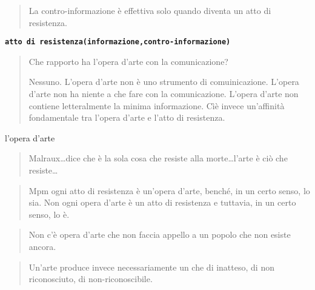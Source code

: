 \documentclass{../../lib/gs}
\newcommand{\apf}[3]{\textbf{\texttt{#1(#2,#3)}}}
\begin{document}
\begin{quote}
\begin{sf}
\small
  La contro-informazione è effettiva solo quando diventa un atto di resistenza.
  \cite{deleuze2009}
  \end{sf}
\end{quote}

\apf{atto di resistenza}{informazione}{contro-informazione}


\begin{quote}
\begin{sf}
\small
  Che rapporto ha l'opera d'arte con la comunicazione?

  Nessuno. L'opera d'arte non è uno strumento di comuinicazione. L'opera d'arte
  non ha niente a che fare con la comunicazione. L'opera d'arte non contiene
  letteralmente la minima informazione. Cìè invece un'affinità fondamentale tra
  l'opera d'arte e l'atto di resistenza.
  \cite{deleuze2009}
  \end{sf}
\end{quote}

l'opera d'arte

\begin{quote}
\begin{sf}
\small
  Malraux\ldots dice che è la sola cosa che resiste alla morte\ldots l'arte
  è ciò che resiste\ldots
  \cite{deleuze2009}
  \end{sf}
\end{quote}

\begin{quote}
\begin{sf}
\small
  Mpm ogni atto di resistenza è un'opera d'arte, benché, in un certo senso, lo
  sia. Non ogni opera d'arte è un atto di resistenza e tuttavia, in un certo
  senso, lo è.
  \cite{deleuze2009}
  \end{sf}
\end{quote}

\begin{quote}
\begin{sf}
\small
  Non c'è opera d'arte che non faccia appello a un popolo che non esiste ancora.
  \cite{deleuze2009}
  \end{sf}
\end{quote}

\begin{quote}
\begin{sf}
\small
  Un'arte produce invece necessariamente un che di inatteso, di non riconosciuto,
  di non-riconoscibile.
  \cite{deleuze2009}
  \end{sf}
\end{quote}
\end{document}
